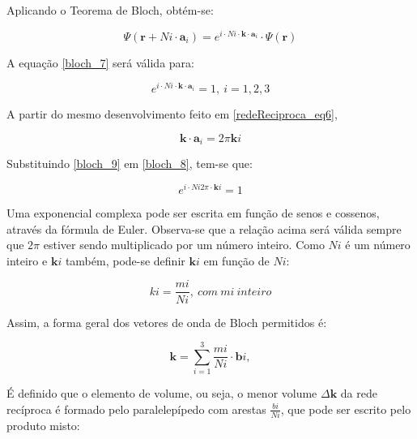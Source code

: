 		\par Aplicando o Teorema de Bloch, obtém-se:

		\begin{equation}
			\label{bloch_7}
			\Psi(\mathbf{r} + Ni \cdot \mathbf{a}_{i}) = e^{i\cdot N i \cdot \mathbf{k} \cdot \mathbf{a}_{i}} \cdot \Psi(\mathbf{r})
		\end{equation}

		\par A equação \eqref{bloch_7} será válida para:

		\begin{equation}
			\label{bloch_8}
			e^{i\cdot N i \cdot \mathbf{k} \cdot \mathbf{a}_{i}} = 1,\ i=1,2,3
		\end{equation}

		\par A partir do mesmo desenvolvimento feito em \eqref{redeReciproca_eq6},

		\begin{equation}
			\label{bloch_9}
			\mathbf{k} \cdot \mathbf{a}_{i} = 2 \pi \mathbf{k} i
		\end{equation}

		\par Substituindo \eqref{bloch_9} em \eqref{bloch_8}, tem-se que:

		\begin{equation}
			\label{bloch_10}
			e^{i\cdot N i 2 \pi \cdot \mathbf{k} i} = 1
		\end{equation}

		\par Uma exponencial complexa pode ser escrita em função de senos e cossenos, através da fórmula de Euler. Observa-se que a relação acima será válida sempre que $2\pi$ estiver sendo multiplicado por um número inteiro. Como $Ni$ é um número inteiro e $\mathbf{k}i$ também, pode-se definir $\mathbf{k}i$ em função de $Ni$:

		\begin{equation}
			\label{bloch_a}
			ki = \frac{mi}{Ni},\ com\ mi\ inteiro
		\end{equation}

		\par Assim, a forma geral dos vetores de onda de Bloch permitidos é:


		\begin{equation}
			\label{bloch_11}
			\mathbf{k} = \sum_{i=1}^3 \frac{mi}{Ni} \cdot \mathbf{b}i,
		\end{equation}

		\par É definido que o elemento de volume, ou seja, o menor volume $\Delta\mathbf{k}$ da rede recíproca é formado pelo paralelepípedo com arestas $\frac{bi}{Ni}$, que pode ser escrito pelo produto misto:


